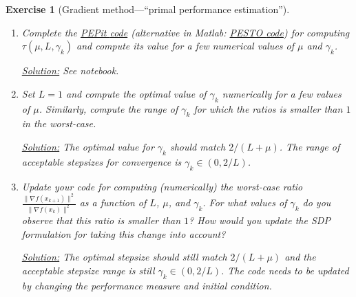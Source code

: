 \documentclass[11pt,a4paper]{article}
\newcommand{\pesto}{{PESTO }}
\newcommand{\pepit}{{PEPit }}
\newcommand{\correction}[1]{{{\color{blue}\underline{Solution:} #1}}}
\newcommand{\correction}[1]{}
\newtheorem{exercise}{Exercise}
\begin{document}
\begin{exercise}[Gradient method---``primal performance estimation'']
\begin{enumerate}
	\item Complete the \href{https://github.com/PerformanceEstimation/Learning-Performance-Estimation/tree/main/Codes/Jupyter/Exercise01.ipynb}{\pepit code} (alternative in Matlab: \href{https://github.com/PerformanceEstimation/Learning-Performance-Estimation/blob/main/Codes/Matlab/Exercise1.m}{\pesto code}) for computing $\tau(\mu,L,\gamma_k)$ and compute its value for a few numerical values of $\mu$ and $\gamma_k$.
	
	\correction{See notebook.}
	
	\item Set $L=1$ and compute the optimal value of $\gamma_k$ numerically for a few values of $\mu$. Similarly, compute the range of $\gamma_k$ for which the ratios is smaller than $1$ in the worst-case.
	
	\correction{The optimal value for $\gamma_k$ should match $2/(L+\mu)$. The range of acceptable stepsizes for convergence is $\gamma_k\in(0,2/L)$.}
	
	\item Update your code for computing (numerically) the worst-case ratio $\frac{\|\nabla f(x_{k+1})\|^2}{\|\nabla f(x_k)\|^2}$ as a function of $L$, $\mu$, and $\gamma_k$. For what values of $\gamma_k$ do you observe that this ratio is smaller than $1$?  How would you update the SDP formulation for taking this change into account?
	
	\correction{The optimal stepsize should still match $2/(L+\mu)$ and the acceptable stepsize range is still $\gamma_k\in(0,2/L)$. The code needs to be updated by changing the performance measure and initial condition.
	
}
\end{enumerate}
\end{exercise}
\end{document}
